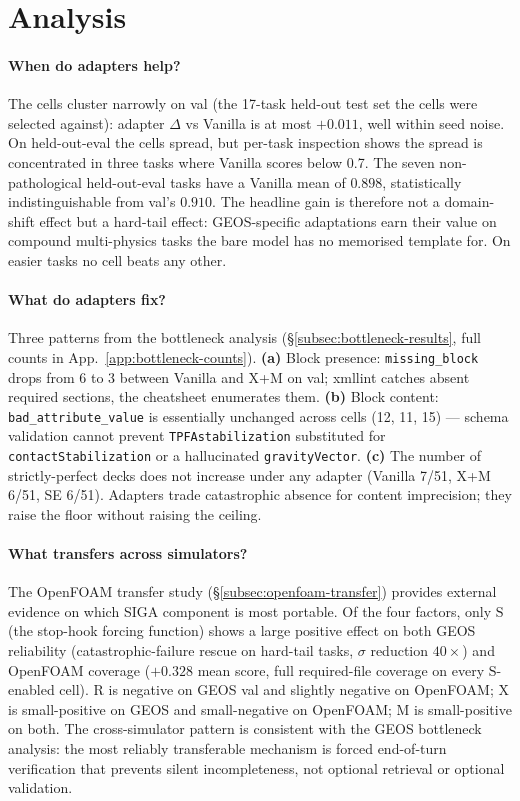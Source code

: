\documentclass{article}
\begin{document}
\section{Analysis}
\label{sec:analysis}

\paragraph{When do adapters help?}
The cells cluster narrowly on val (the 17-task held-out test set the cells were selected against): adapter $\Delta$ vs Vanilla is at most $+0.011$, well within seed noise. On held-out-eval the cells spread, but per-task inspection shows the spread is concentrated in three tasks where Vanilla scores below 0.7. The seven non-pathological held-out-eval tasks have a Vanilla mean of $0.898$, statistically indistinguishable from val's $0.910$. The headline gain is therefore not a domain-shift effect but a hard-tail effect: GEOS-specific adaptations earn their value on compound multi-physics tasks the bare model has no memorised template for. On easier tasks no cell beats any other.

\paragraph{What do adapters fix?}
Three patterns from the bottleneck analysis (\S\ref{subsec:bottleneck-results}, full counts in App.~\ref{app:bottleneck-counts}). \textbf{(a)} Block presence: \texttt{missing\_block} drops from 6 to 3 between Vanilla and X+M on val; xmllint catches absent required sections, the cheatsheet enumerates them. \textbf{(b)} Block content: \texttt{bad\_attribute\_value} is essentially unchanged across cells (12, 11, 15) --- schema validation cannot prevent \texttt{TPFAstabilization} substituted for \texttt{contactStabilization} or a hallucinated \texttt{gravityVector}. \textbf{(c)} The number of strictly-perfect decks does not increase under any adapter (Vanilla 7/51, X+M 6/51, SE 6/51). Adapters trade catastrophic absence for content imprecision; they raise the floor without raising the ceiling.

\paragraph{What transfers across simulators?}
The OpenFOAM transfer study (\S\ref{subsec:openfoam-transfer}) provides external evidence on which SIGA component is most portable. Of the four factors, only $\mathrm{S}$ (the stop-hook forcing function) shows a large positive effect on both GEOS reliability (catastrophic-failure rescue on hard-tail tasks, $\sigma$ reduction $40\times$) and OpenFOAM coverage ($+0.328$ mean score, full required-file coverage on every $\mathrm{S}$-enabled cell). $\mathrm{R}$ is negative on GEOS val and slightly negative on OpenFOAM; $\mathrm{X}$ is small-positive on GEOS and small-negative on OpenFOAM; $\mathrm{M}$ is small-positive on both. The cross-simulator pattern is consistent with the GEOS bottleneck analysis: the most reliably transferable mechanism is forced end-of-turn verification that prevents silent incompleteness, not optional retrieval or optional validation.
\end{document}
